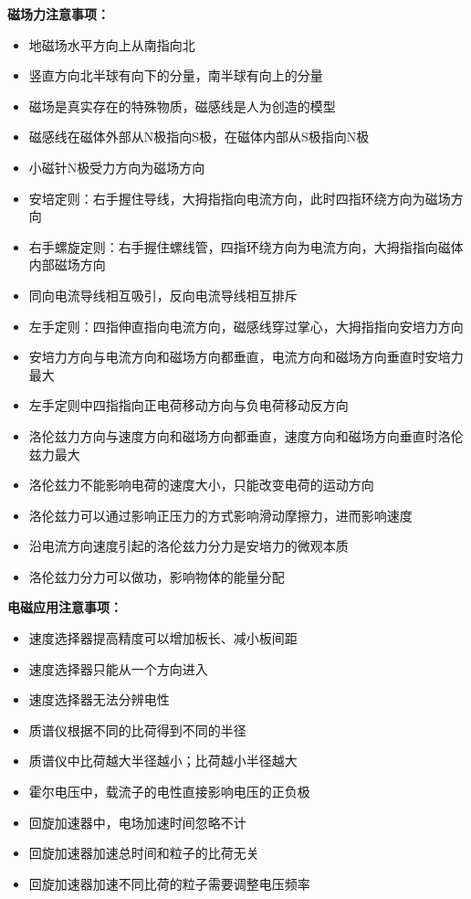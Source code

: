 \noindent\textbf{磁场力注意事项：}
\begin{itemize}
  \item 地磁场水平方向上从南指向北
  \item 竖直方向北半球有向下的分量，南半球有向上的分量
  \item 磁场是真实存在的特殊物质，磁感线是人为创造的模型
  \item 磁感线在磁体外部从N极指向S极，在磁体内部从S极指向N极
  \item 小磁针N极受力方向为磁场方向
  \item 安培定则：右手握住导线，大拇指指向电流方向，此时四指环绕方向为磁场方向
  \item 右手螺旋定则：右手握住螺线管，四指环绕方向为电流方向，大拇指指向磁体内部磁场方向
  \item 同向电流导线相互吸引，反向电流导线相互排斥
  \item 左手定则：四指伸直指向电流方向，磁感线穿过掌心，大拇指指向安培力方向
  \item 安培力方向与电流方向和磁场方向都垂直，电流方向和磁场方向垂直时安培力最大
  \item 左手定则中四指指向正电荷移动方向与负电荷移动反方向
  \item 洛伦兹力方向与速度方向和磁场方向都垂直，速度方向和磁场方向垂直时洛伦兹力最大
  \item 洛伦兹力不能影响电荷的速度大小，只能改变电荷的运动方向
  \item 洛伦兹力可以通过影响正压力的方式影响滑动摩擦力，进而影响速度
  \item 沿电流方向速度引起的洛伦兹力分力是安培力的微观本质
  \item 洛伦兹力分力可以做功，影响物体的能量分配
\end{itemize}

\noindent\textbf{电磁应用注意事项：}
\begin{itemize}
  \item 速度选择器提高精度可以增加板长、减小板间距
  \item 速度选择器只能从一个方向进入
  \item 速度选择器无法分辨电性
  \item 质谱仪根据不同的比荷得到不同的半径
  \item 质谱仪中比荷越大半径越小；比荷越小半径越大
  \item 霍尔电压中，载流子的电性直接影响电压的正负极
  \item 回旋加速器中，电场加速时间忽略不计
  \item 回旋加速器加速总时间和粒子的比荷无关
  \item 回旋加速器加速不同比荷的粒子需要调整电压频率
\end{itemize}

